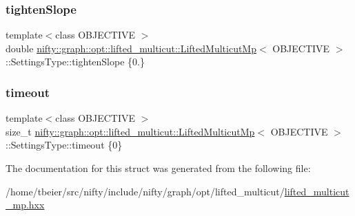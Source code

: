 \subsubsection{\texorpdfstring{tighten\+Slope}{tightenSlope}}
{\footnotesize\ttfamily template$<$class O\+B\+J\+E\+C\+T\+I\+VE $>$ \\
double \hyperlink{classnifty_1_1graph_1_1opt_1_1lifted__multicut_1_1LiftedMulticutMp}{nifty\+::graph\+::opt\+::lifted\+\_\+multicut\+::\+Lifted\+Multicut\+Mp}$<$ O\+B\+J\+E\+C\+T\+I\+VE $>$\+::Settings\+Type\+::tighten\+Slope \{0.\}}

\mbox{\label{structnifty_1_1graph_1_1opt_1_1lifted__multicut_1_1LiftedMulticutMp_1_1SettingsType_a5eafcdff15e98676b8115e56f148a527}} 
\subsubsection{\texorpdfstring{timeout}{timeout}}
{\footnotesize\ttfamily template$<$class O\+B\+J\+E\+C\+T\+I\+VE $>$ \\
size\+\_\+t \hyperlink{classnifty_1_1graph_1_1opt_1_1lifted__multicut_1_1LiftedMulticutMp}{nifty\+::graph\+::opt\+::lifted\+\_\+multicut\+::\+Lifted\+Multicut\+Mp}$<$ O\+B\+J\+E\+C\+T\+I\+VE $>$\+::Settings\+Type\+::timeout \{0\}}



The documentation for this struct was generated from the following file\+:\begin{DoxyCompactItemize}
\item 
/home/tbeier/src/nifty/include/nifty/graph/opt/lifted\+\_\+multicut/\hyperlink{lifted__multicut__mp_8hxx}{lifted\+\_\+multicut\+\_\+mp.\+hxx}\end{DoxyCompactItemize}
